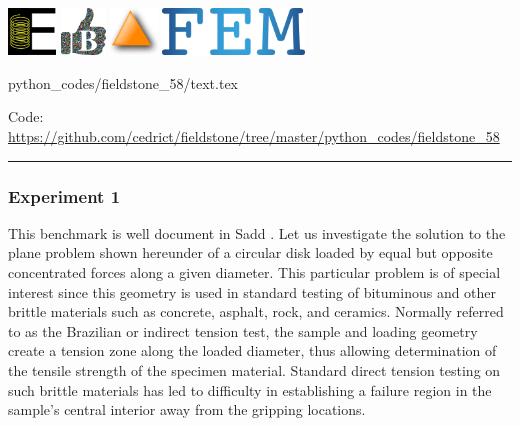\includegraphics[height=1.25cm]{images/pictograms/elasticity}
\includegraphics[height=1.25cm]{images/pictograms/benchmark}
\includegraphics[height=1.25cm]{images/pictograms/triangle}
\includegraphics[height=1.25cm]{images/pictograms/FEM}



\begin{flushright} {\tiny {\color{gray} python\_codes/fieldstone\_58/text.tex}} \end{flushright}



\begin{center}
Code: \url{https://github.com/cedrict/fieldstone/tree/master/python_codes/fieldstone_58}
\end{center}

\par\noindent\rule{\textwidth}{0.4pt}



\subsubsection*{Experiment 1}

This benchmark is well document in Sadd \cite{sadd14}.
Let us investigate the solution to the plane problem shown hereunder of a circular disk 
loaded by equal but opposite concentrated forces along a given diameter. 
This particular problem is of special interest since this geometry is used 
in standard testing of bituminous and other brittle materials such as 
concrete, asphalt, rock, and ceramics. Normally referred to as the Brazilian or indirect tension test, 
the sample and loading geometry create a tension zone along the loaded diameter, 
thus allowing determination of the tensile strength of the specimen material. 
Standard direct tension testing on such brittle materials has led to difficulty 
in establishing a failure region in the sample’s central interior away from 
the gripping locations.

